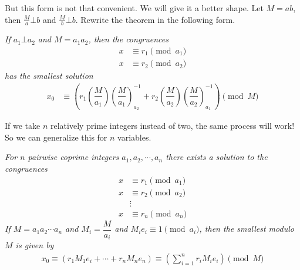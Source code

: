 \documentclass{subfile}
\begin{document}
	But this form is not that convenient. We will give it a better shape. Let $M=ab$, then $\frac{M}{a}\bot b$ and $\frac{M}{b}\bot b$. Rewrite the theorem in the following form.
		\begin{theorem}\slshape
			If $a_1\bot a_2$ and $M=a_1a_2$, then the congruences
			\begin{align*}
			x & \equiv r_1\pmod{a_1}\\
			x & \equiv r_2\pmod{a_2}
			\end{align*}
			has the smallest solution
			\begin{align*}
			x_0 & \equiv
			\left(r_1\left(\dfrac{M}{a_1}\right)\left(\dfrac{M}{a_1}\right)^{-1}_{a_2}+r_2\left(\dfrac{M}{a_2}\right)\left(\dfrac{M}{a_2}\right)^{-1}_{a_1}\right)\pmod{M}
			\end{align*}
		\end{theorem}
	If we take $n$ relatively prime integers instead of two, the same process will work! So we can generalize this for $n$ variables.
		\begin{theorem}[CRT]\slshape
			For $n$ pairwise coprime integers $a_1,a_2,\cdots,a_n$ there exists a solution to the congruences
				\begin{align*}
					x & \equiv r_1\pmod{a_1}\\
					x & \equiv r_2\pmod{a_2}\\
					   &\vdots\\
					x & \equiv r_n\pmod{a_n}
				\end{align*}
			If $M=a_1a_2\cdots a_n$ and $M_i=\dfrac{M}{a_i}$ and $M_ie_i\equiv1\pmod{a_i}$, then the smallest  modulo $M$ is given by
			\begin{align*}
			x_0  \equiv \left(r_1 M_1e_i+\cdots+r_n M_ne_n\right)\equiv \left(\sum_{i=1}^{n} r_i M_ie_i\right)\pmod M
			\end{align*}
		\end{theorem}
\end{document}
